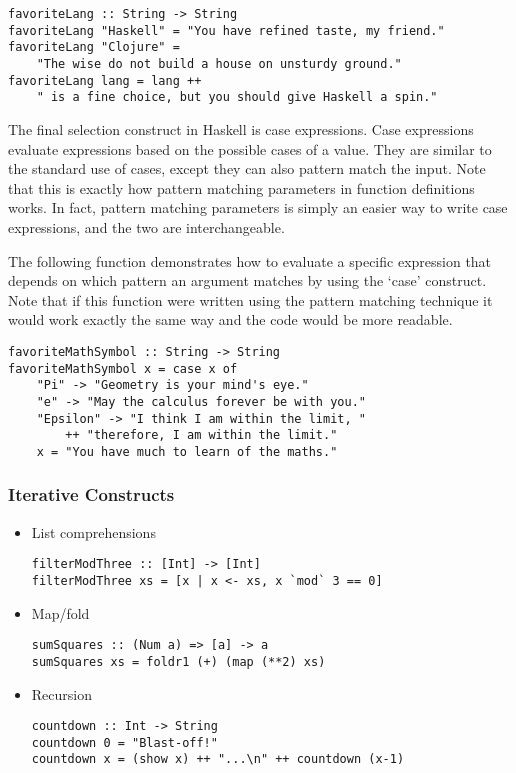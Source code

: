 \documentclass[titlepage,12pt]{article}
\newcommand{\bi}{\begin{itemize}}
\newcommand{\ei}{\end{itemize}}
\begin{document}
\begin{verbatim}
favoriteLang :: String -> String
favoriteLang "Haskell" = "You have refined taste, my friend."
favoriteLang "Clojure" = 
    "The wise do not build a house on unsturdy ground."
favoriteLang lang = lang ++ 
    " is a fine choice, but you should give Haskell a spin."
\end{verbatim}

The final selection construct in Haskell is case expressions. Case expressions evaluate expressions based on 
the possible cases of a value. They are similar to the standard use of cases, except they can also pattern 
match the input. Note that this is exactly how pattern matching parameters in function definitions works. In 
fact, pattern matching parameters is simply an easier way to write case expressions, and the two are interchangeable. 

The following function demonstrates how to evaluate a specific expression that depends on which pattern 
an argument matches by using the `case' construct. Note that if this function were written using the 
pattern matching technique it would work exactly the same way and the code would be more readable. 

\begin{verbatim}
favoriteMathSymbol :: String -> String
favoriteMathSymbol x = case x of
    "Pi" -> "Geometry is your mind's eye."
    "e" -> "May the calculus forever be with you."
    "Epsilon" -> "I think I am within the limit, "
        ++ "therefore, I am within the limit."
    x = "You have much to learn of the maths."
\end{verbatim}

\subsubsection{Iterative Constructs}
\bi
    \item List comprehensions
\begin{verbatim}
filterModThree :: [Int] -> [Int]
filterModThree xs = [x | x <- xs, x `mod` 3 == 0]
\end{verbatim}
    \item Map/fold
\begin{verbatim}
sumSquares :: (Num a) => [a] -> a
sumSquares xs = foldr1 (+) (map (**2) xs)
\end{verbatim}
    \item Recursion
\begin{verbatim}
countdown :: Int -> String
countdown 0 = "Blast-off!"
countdown x = (show x) ++ "...\n" ++ countdown (x-1)
\end{verbatim}
\ei
\end{document}
